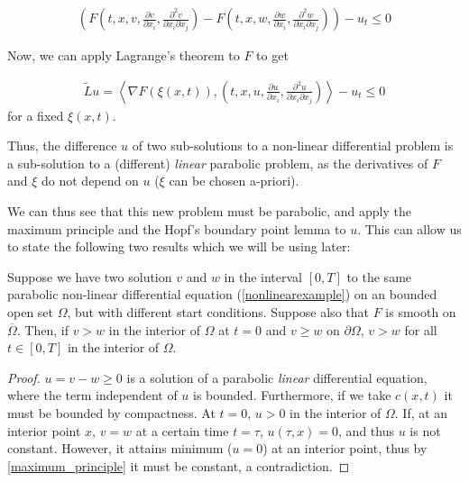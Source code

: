 \begin{align*}
	\left( F\left(t, x, v, \frac{\partial v}{\partial x_i} , \frac{\partial^2 v}{\partial x_i \partial x_j}\right) - F\left(t, x, w, \frac{\partial w}{\partial x_i} , \frac{\partial^2 w}{\partial x_i \partial x_j}\right)\right)-u_t \leq 0
\end{align*}

Now, we can apply Lagrange's theorem to $F$ to get 

\begin{align*}
	\tilde{L}u= \left\langle \nabla F(\xi(x, t)), \left(t, x, u, \frac{\partial u}{\partial x_i} , \frac{\partial^2 u}{\partial x_i \partial x_j}\right) \right\rangle-u_t \leq 0
\end{align*}
for a fixed $\xi(x, t)$.


Thus, the difference $u$ of two sub-solutions to a non-linear differential problem is a sub-solution to a (different) \textit{linear} parabolic problem, as the derivatives of $F$ and $\xi$ do not depend on $u$ ($\xi$ can be chosen a-priori).

We can thus see that this new problem must be parabolic, and apply the maximum principle and the Hopf's boundary point lemma to $u$. This can allow us to state the following two results which we will be using later:

\begin{proposition}
	\label{firstapplication}
	Suppose we have two solution $v$ and $w$ in the interval $[0, T]$ to the same parabolic non-linear differential equation (\ref{nonlinearexample}) on an bounded open set $\Omega$, but with different start conditions. Suppose also that $F$ is smooth on  $\overline{\Omega}$. Then, if $v>w$ in the interior of $\Omega$ at $t=0$ and $v\geq w$ on $\partial\Omega$,  $v>w$ for all $t\in[0, T]$ in the interior of $\Omega$.
\end{proposition}

\begin{proof}
	$u=v-w\geq 0$ is a solution of a parabolic \textit{linear} differential equation, where the term independent of $u$ is bounded. Furthermore, if we take $c(x, t)$ it must be bounded by compactness. At $t=0$, $u>0$ in the interior of $\Omega$. If, at an interior point $x$, $v=w$ at a certain time $t=\tau$, $u(\tau, x)=0$, and thus $u$ is not constant. However, it attains minimum ($u=0$) at an interior point, thus by \ref{maximum_principle} it must be constant, a contradiction. 
\end{proof}

